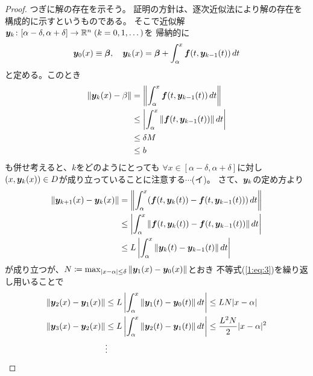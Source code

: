\documentclass[report]{jlreq}
\begin{document}
\begin{proof}
    つぎに解の存在を示そう。
    証明の方針は、逐次近似法により解の存在を構成的に示すというものである。
    そこで近似解$\bm{y}_k \colon [\alpha - \delta, \alpha + \delta] \to \mathbb{R}^n\; (k = 0, 1, \dots)$を
    帰納的に
    \begin{equation}
        \bm{y}_0(x) \equiv \bm{\beta},\quad
        \bm{y}_k(x) = \bm{\beta} + \int_\alpha^x \bm{f}(t, \bm{y}_{k-1}(t))\, dt
        \label{1:eq:4}
    \end{equation}
    と定める。このとき
    \begin{equation}
        \begin{split}
            \| \bm{y}_k(x) - \beta \|
                &= \left\| \int_\alpha^x \bm{f}(t, \bm{y}_{k-1}(t))\, dt \right\| \\
                &\le \left| \int_\alpha^x \| \bm{f}(t, \bm{y}_{k-1}(t)) \|\, dt \right| \\
                &\le \delta M \\
                &\le b
        \end{split}
    \end{equation}
    も併せ考えると、$k$をどのようにとっても
    $\forall x \in [\alpha - \delta, \alpha + \delta]$に対し
    $(x, \bm{y}_k(x)) \in D$が成り立っていることに注意する$\cdots$(イ)。
    さて、$\bm{y}_k$の定め方より
    \begin{align}
        \| \bm{y}_{k+1}(x) - \bm{y}_k(x) \|
            &= \left\| \int_\alpha^x (\bm{f}(t, \bm{y}_k(t)) - \bm{f}(t, \bm{y}_{k-1}(t)))\, dt \right\| \\
            &\le \left| \int_\alpha^x \| \bm{f}(t, \bm{y}_k(t)) - \bm{f}(t, \bm{y}_{k-1}(t)) \|\, dt \right| \\
            &\le L \left| \int_\alpha^x \| \bm{y}_k(t) - \bm{y}_{k-1}(t) \|\, dt \right|
                \label{1:eq:3}
    \end{align}
    が成り立つが、$N \coloneqq \max_{|x - \alpha| \le \delta} \| \bm{y}_1(x) - \bm{y}_0(x) \|$とおき
    不等式(\ref{1:eq:3})を繰り返し用いることで
    \begin{equation}
        \begin{split}
            \| \by_2(x) - \by_1(x) \|
                &\le L \left| \int_\alpha^x \| \by_1(t) - \by_0(t) \|\, dt \right|
                \le LN |x - \alpha| \\
            \| \by_3(x) - \by_2(x) \|
                &\le L \left| \int_\alpha^x \| \by_2(t) - \by_1(t) \|\, dt \right|
                \le \frac{L^2 N}{2} |x - \alpha|^2 \\
                &\vdots \\

\end{split}
\end{equation}
\end{proof}
\end{document}
